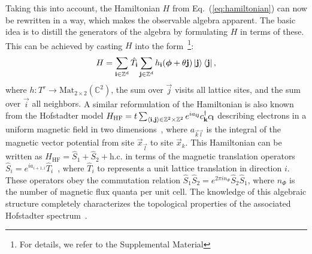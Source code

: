 \documentclass[
    10pt,
    aps,
    prl,
    twocolumn,
    floatfix,
    superscriptaddress
]{revtex4-2}
\newcommand{\revise}[1]{{\color{blue}#1}}
\begin{document}

Taking this into account, the Hamiltonian $H$ from Eq.~(\ref{eq:hamiltonian}) can now be rewritten in a way, which makes the observable algebra apparent.
The basic idea is to distill the generators of the algebra by formulating $H$ in terms of these.
This can be achieved by casting $H$ into the form~\footnote{For details, we refer to the Supplemental Material}:
\begin{equation}
    H =  \sum_{\mathbf{i} \in \mathbb{Z}^d} \hat{T}_{\mathbf{i}}  \sum_{\mathbf{j} \in \mathbb{Z}^d} h_{\mathbf{i}}( \boldsymbol{\phi} + \theta \mathbf{j} ) \ket{ \mathbf{j}} \bra{ \mathbf{j}} ,
    \label{eq:covariant_hamiltonian}
\end{equation}
where $h\colon T^r \to \mathrm{Mat}_{2\times2} (\mathbb{C}^2)$,
the sum over $\vec{j}$ visits all lattice sites, and the sum over $\vec{i}$ all neighbors.
\revise{
A similar reformulation of the Hamiltonian is also known from the Hofstadter model $H_\mathrm{HF} = t \sum_{\braket{\mathbf{i},\mathbf{j}} \in \mathbb{Z}^{2} \times \mathbb{Z}^2}e^{i a_{\mathbf{i} \mathbf{j}}} c_{\mathbf{k}}^\dagger c_{\mathbf{l}} $ describing electrons in a uniform magnetic field in two dimensions~\cite{Hofstadter1976}, where $a_{\vec{k} \vec{l}}$ is the integral of the magnetic vector potential from site $\vec{x}_\vec{l}$ to site $\vec{x}_k$.
This Hamiltonian can be written as $H_\mathrm{HF} = \hat{S}_1 +  \hat{S}_2 + \mathrm{h.c.} $ in terms of the magnetic translation operators $\hat{S}_i = e^{i a_{i+1,i}} \hat{T}_i$~\cite{Zak1964}, where $\hat{T}_i$ to represents a unit lattice translation in direction $i$.
These operators obey the commutation relation $\hat{S}_1 \hat{S}_2 = e^{2\pi i n_\Phi} \hat{S}_2 \hat{S}_1$, where $n_\Phi$ is the number of magnetic flux quanta per unit cell.
The knowledge of this algebraic structure completely characterizes the topological properties of the associated Hofstadter spectrum~\cite{Hofstadter1976, Bellissard1994, Prodan2016}.
}
\end{document}
